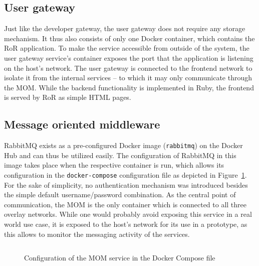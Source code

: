 
  \subsection{User gateway} %
    \label{sub:user_gateway}
    Just like the developer gateway, the user gateway does not require any storage mechanism. It thus also consists of only one Docker container, which contains the \ac{RoR} application. To make the service accessible from outside of the system, the user gateway service's container exposes the port that the  application is listening on the host's network. The user gateway is connected to the frontend network to isolate it from the internal services -- to which it may only communicate through the \ac{MOM}.
    While the backend functionality is implemented in Ruby, the frontend is served by \ac{RoR} as simple \ac{HTML} pages.

  \subsection{Message oriented middleware} %
    \label{sub:message_oriented_middleware}
      RabbitMQ exists as a pre-configured Docker image (\texttt{rabbitmq}) on the Docker Hub and can thus be utilized easily. The configuration of RabbitMQ in this image takes place when the respective container is run, which allows its configuration in the \texttt{docker-compose} configuration file as depicted in Figure~\ref{fig:configuration_of_the_mom_service_in_the_docker_compose_file}.
      For the sake of simplicity, no authentication mechanism was introduced besides the simple default username/password combination. As the central point of communication, the \ac{MOM} is the only container which is connected to all three overlay networks. While one would probably avoid exposing this service in a real world use case, it is exposed to the host's network for its use in a prototype, as this allows to monitor the messaging activity of the services.

      \begin{figure}[!htbp]
        \inputminted[firstline=23,lastline=33,fontsize=\footnotesize,linenos=true,numberblanklines=true,showspaces=false,breaklines=true,baselinestretch=1]{yaml}{../code/wfms.yml}
        \caption{Configuration of the \ac{MOM} service in the Docker Compose file}
        \label{fig:configuration_of_the_mom_service_in_the_docker_compose_file}
      \end{figure}

